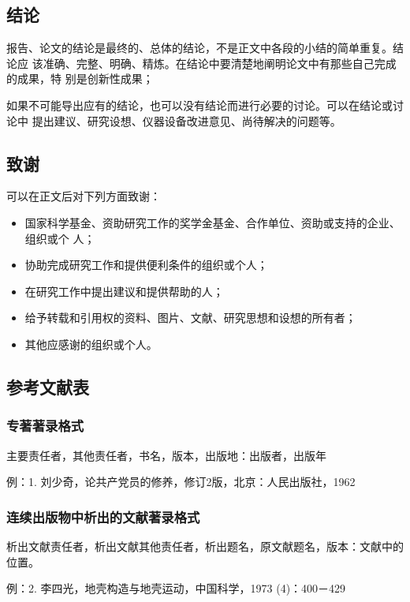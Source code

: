 \documentclass[master]{njuthesis}
\begin{document}
\subsection{结论}

报告、论文的结论是最终的、总体的结论，不是正文中各段的小结的简单重复。结论应
该准确、完整、明确、精炼。在结论中要清楚地阐明论文中有那些自己完成的成果，特
别是创新性成果；

如果不可能导出应有的结论，也可以没有结论而进行必要的讨论。可以在结论或讨论中
提出建议、研究设想、仪器设备改进意见、尚待解决的问题等。

\subsection{致谢}

可以在正文后对下列方面致谢：

\begin{itemize}
\item 国家科学基金、资助研究工作的奖学金基金、合作单位、资助或支持的企业、组织或个
人；
\item 协助完成研究工作和提供便利条件的组织或个人；
\item 在研究工作中提出建议和提供帮助的人；
\item 给予转载和引用权的资料、图片、文献、研究思想和设想的所有者；
\item 其他应感谢的组织或个人。
\end{itemize}

\subsection{参考文献表}

\subsubsection{专著著录格式}

主要责任者，其他责任者，书名，版本，出版地：出版者，出版年

例：1. 刘少奇，论共产党员的修养，修订2版，北京：人民出版社，1962

\subsubsection{连续出版物中析出的文献著录格式}

析出文献责任者，析出文献其他责任者，析出题名，原文献题名，版本：文献中的位置。

例：2. 李四光，地壳构造与地壳运动，中国科学，1973 (4)：400－429
\end{document}
